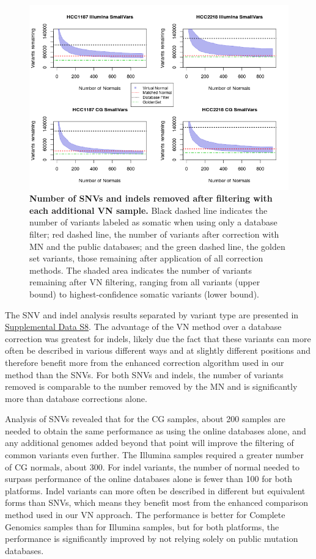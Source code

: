 \begin{figure}[t!]
\centering
\includegraphics[width=\textwidth]{chapters/images/virtualnormal/Hiltemann_Figure4.png}
\caption{\textbf{Number of SNVs and indels removed after filtering with each additional VN sample.} Black dashed line indicates the number of variants labeled as somatic when using only a database filter; red dashed line, the number of variants after correction with MN and the public databases; and the green dashed line, the golden set variants, those remaining after application of all correction methods. The shaded area indicates the number of variants remaining after VN filtering, ranging from all variants (upper bound) to highest-confidence somatic variants (lower bound).}
\label{fig:vnsize2}
\end{figure}

The SNV and indel analysis results separated by variant type are presented in \href{https://genome.cshlp.org/content/25/9/1382/suppl/DC1}{Supplemental Data S8}. The advantage of the VN method over a database correction was greatest for indels, likely due the fact that these variants can more often be described in various different ways and at slightly different positions and therefore benefit more from the enhanced correction algorithm used in our method than the SNVs. For both SNVs and indels, the number of variants removed is comparable to the number removed by the MN and is significantly more than database corrections alone.

Analysis of SNVs revealed that for the CG samples, about 200 samples are needed to obtain the same performance as using the online databases alone, and any additional genomes added beyond that point will improve the filtering of common variants even further. The Illumina samples required a greater number of CG normals, about 300. For indel variants, the number of normal needed to surpass performance of the online databases alone is fewer than 100 for both platforms. Indel variants can more often be described in different but equivalent forms than SNVs, which means they benefit most from the enhanced comparison method used in our VN approach. The performance is better for Complete Genomics samples than for Illumina samples, but for both platforms, the performance is significantly improved by not relying solely on public mutation databases.

